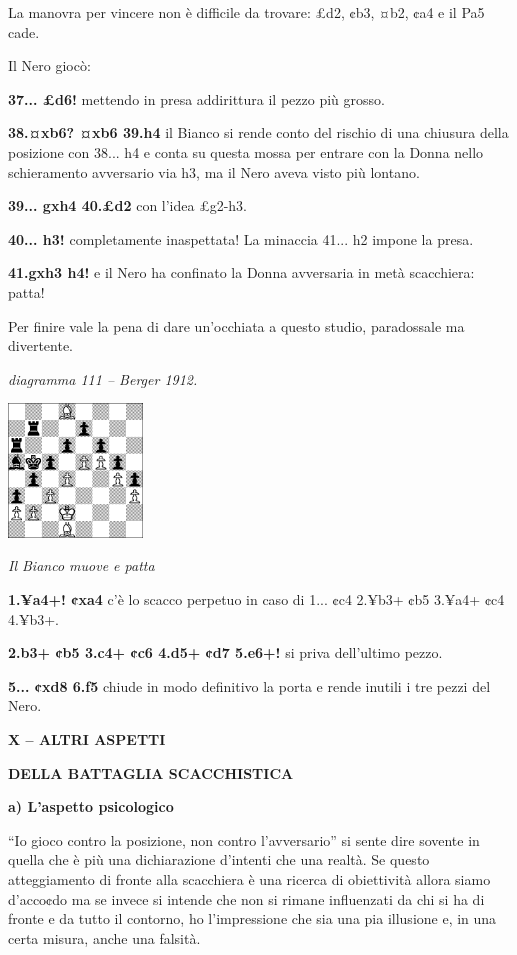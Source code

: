 \documentclass[
]{article}
\begin{document}
La manovra per vincere non è difficile da trovare: £d2, ¢b3, ¤b2, ¢a4 e
il Pa5 cade.

Il Nero giocò:

\textbf{37... £d6!} mettendo in presa addirittura il pezzo più grosso.

\textbf{38.¤xb6? ¤xb6 39.h4} il Bianco si rende conto del rischio di una
chiusura della posizione con 38... h4 e conta su questa mossa per
entrare con la Donna nello schieramento avversario via h3, ma il Nero
aveva visto più lontano.

\textbf{39... gxh4 40.£d2} con l'idea £g2-h3.

\textbf{40... h3!} completamente inaspettata! La minaccia 41... h2
impone la presa.

\textbf{41.gxh3 h4!} e il Nero ha confinato la Donna avversaria in metà
scacchiera: patta!

Per finire vale la pena di dare un'occhiata a questo studio, paradossale
ma divertente.

\emph{diagramma 111 -- Berger 1912.}

\includegraphics[width=1.40139in,height=1.40139in]{vertopal_109f12be458a423d8f3cc838880eaea2/media/image111.png}

\emph{Il Bianco muove e patta}

\textbf{1.¥a4+! ¢xa4} c'è lo scacco perpetuo in caso di 1... ¢c4 2.¥b3+
¢b5 3.¥a4+ ¢c4 4.¥b3+.

\textbf{2.b3+ ¢b5 3.c4+ ¢c6 4.d5+ ¢d7 5.e6+!} si priva dell'ultimo
pezzo.

\textbf{5... ¢xd8 6.f5} chiude in modo definitivo la porta e rende
inutili i tre pezzi del Nero.

\textbf{X -- ALTRI ASPETTI}

\textbf{DELLA BATTAGLIA SCACCHISTICA}

\textbf{a) L'aspetto psicologico}

``Io gioco contro la posizione, non contro l'avversario'' si sente dire
sovente in quella che è più una dichiarazione d'intenti che una realtà.
Se questo atteggiamento di fronte alla scacchiera è una ricerca di
obiettività allora siamo d'acco¢do ma se invece si intende che non si
rimane influenzati da chi si ha di fronte e da tutto il contorno, ho
l'impressione che sia una pia illusione e, in una certa misura, anche
una falsità.
\end{document}

